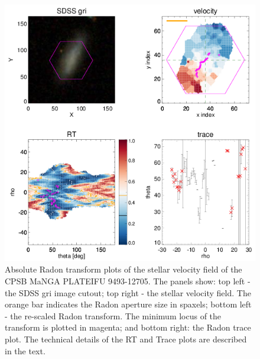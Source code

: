 
\begin{figure}
    \centering
    \includegraphics[width=\columnwidth]{images/RadonPlots/RT-SNIPS-NEW/RT=CPSB=9493-12705-SNIP.png}
    \caption{Absolute Radon transform plots of the stellar velocity field of the CPSB MaNGA PLATEIFU 9493-12705. The panels show: top left - the SDSS gri image cutout; top right - the stellar velocity field. The orange bar indicates the Radon aperture size in spaxels; bottom left - the re-scaled Radon transform. The minimum locus of the transform is plotted in magenta; and bottom right: the Radon trace plot. The technical details of the RT and Trace plots are described in the text.}
    \label{fig:RT-CPSB-9493-12705-SNIP}
\end{figure}